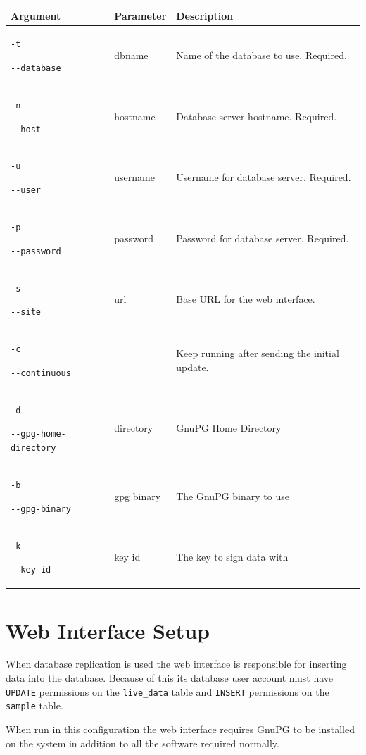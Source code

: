 \documentclass[a4paper,10pt,draft]{book}
\begin{document}
\begin{tabular}{p{4.2cm} l p{7.9cm}}
\hline
\textbf{Argument} & \textbf{Parameter} & \textbf{Description} \\
\hline
\verb|-t| \par \verb|--database| & dbname & Name of the database to use. Required. \\
\verb|-n| \par \verb|--host| & hostname & Database server hostname. Required. \\
\verb|-u| \par \verb|--user| & username & Username for database server. Required. \\
\verb|-p| \par \verb|--password| & password & Password for database server. Required. \\

\verb|-s| \par \verb|--site| & url & Base URL for the web interface. \\

\verb|-c| \par \verb|--continuous| & & Keep running after sending the initial update. \\

\verb|-d| \par \verb|--gpg-home-directory| & directory & GnuPG Home Directory \\

\verb|-b| \par \verb|--gpg-binary| & gpg binary & The GnuPG binary to use \\

\verb|-k| \par \verb|--key-id| & key id & The key to sign data with \\
\hline
\end{tabular}



\section{Web Interface Setup}

When database replication is used the web interface is responsible for inserting data into the database. Because of this its database user account must have \verb|UPDATE| permissions on the \verb|live_data| table and \verb|INSERT| permissions on the \verb|sample| table.

When run in this configuration the web interface requires GnuPG to be installed on the system in addition to all the software required normally.
\end{document}
